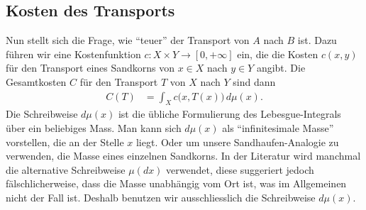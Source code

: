 \subsection{Kosten des Transports\label{mongekant:subsection:transport_cost}}
Nun stellt sich die Frage,
wie ``teuer'' der Transport von $A$ nach $B$ ist.
Dazu führen wir eine Kostenfunktion $c : X \times Y \to [0, +\infty]$ ein,
%
die die Kosten $c(x,y)$ für den Transport eines Sandkorns
von $x \in X$ nach $y \in Y$ angibt.
%
Die Gesamtkosten $C$ für den Transport $T$ von $X$ nach $Y$ sind dann
%
\begin{align}
C(T)
&=
\int_X c\bigl(x, T(x)\bigr) \, d\mu(x)
\label{mongekant:eq:monge_transport_cost}
.
\end{align}
Die Schreibweise $d\mu(x)$ ist die übliche Formulierung des
Lebesgue-Integrals über ein beliebiges Mass.
%
Man kann sich $d\mu(x)$ als ``infinitesimale Masse'' vorstellen,
die an der Stelle $x$ liegt.
Oder um unsere Sandhaufen-Analogie zu verwenden,
die Masse eines einzelnen Sandkorns.
In der Literatur wird manchmal die alternative Schreibweise $\mu(dx)$ verwendet,
diese suggeriert jedoch fälschlicherweise, dass die Masse unabhängig vom Ort ist,
was im Allgemeinen nicht der Fall ist.
Deshalb benutzen wir ausschliesslich die Schreibweise $d\mu(x)$.
